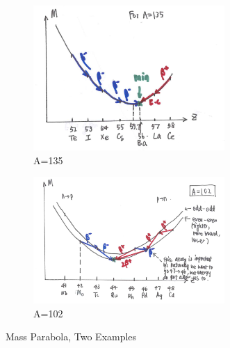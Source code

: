 \documentclass{school-22.101-notes}
\begin{document}
\begin{figure}[ht]
  \centering
  \begin{subfigure}[b]{0.45\textwidth}
    \centering
    \includegraphics[width=0.8\textwidth]{images/rd/M-Z-A135.png}
    \caption{A=135}\label{A135}
  \end{subfigure}
  \begin{subfigure}[b]{0.45\textwidth}
    \centering
    \includegraphics[width=0.8\textwidth]{images/rd/M-Z-A102.png}
    \caption{A=102}\label{A102}
  \end{subfigure}
  \caption{Mass Parabola, Two Examples} \label{mass-parabola}
\end{figure}
\end{document}
